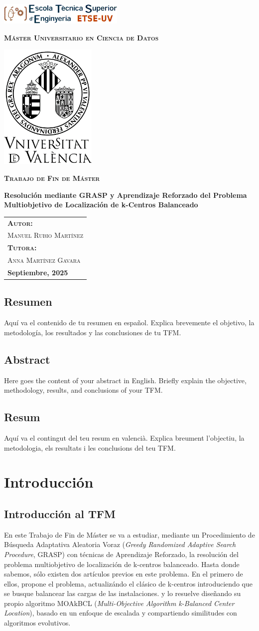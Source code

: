 \documentclass[12pt,a4paper]{book}
\newcommand{\nuevaportada}[6]{
    \thispagestyle{empty}
    \begin{center}
        \vfill 
        
        \includegraphics[width=0.45\textwidth]{images/logo.png}
        
        \vspace{0.5cm} %
        {\large\bfseries\textsc{M\'aster Universitario en #1}\par} %
        
        \vspace{0.5cm}
        \includegraphics[width=0.35\textwidth]{images/uv.png} %
        
        \vspace{0.5cm}
        {\large\bfseries\textsc{Trabajo de Fin de M\'aster}\par} %
        
        \vfill 
        
        {\LARGE\bfseries #2\par} %
        
        \vfill %
        
        \begin{flushright}
            \begin{tabular}{l} 
                {\large\bfseries\textsc{Autor:}} \\
                {\large\textsc{#3}} \\ [0.2cm] %
                {\large\bfseries\textsc{Tutora:}} \\ 
                {\large\textsc{#4}} \\ [0.2cm] %
                {\large\bfseries #5} 
            \end{tabular}
        \end{flushright}
        
        \vfill %
    \end{center}
}
\begin{document}
\nuevaportada{Ciencia de Datos}{Resolución mediante GRASP y Aprendizaje Reforzado del Problema Multiobjetivo de Localización de k-Centros Balanceado }{Manuel Rubio Martínez}{Anna Martínez Gavara}{Septiembre, 2025}

\clearpage

\newpage
\tableofcontents

\newpage

\section*{Resumen}
Aquí va el contenido de tu resumen en español. Explica brevemente el objetivo, la metodología, los resultados y las conclusiones de tu TFM.

\newpage

\section*{Abstract}
Here goes the content of your abstract in English. Briefly explain the objective, methodology, results, and conclusions of your TFM.

\newpage

\section*{Resum}
Aquí va el contingut del teu resum en valencià. Explica breument l'objectiu, la metodologia, els resultats i les conclusions del teu TFM.

\newpage
 
\chapter{Introducción}

\section{Introducción al TFM}
En este Trabajo de Fin de Máster se va a estudiar, mediante un Procedimiento de Búsqueda Adaptativa Aleatoria Voraz (\textit{Greedy Randomized Adaptive Search Procedure}, GRASP) con técnicas de Aprendizaje Reforzado, la resolución del problema multiobjetivo de localización de k-centros balanceado.
Hasta donde sabemos, sólo existen dos artículos previos en este problema. En el primero de ellos, \citet{k-balanced_1} propone el problema, actualizándo el clásico de k-centros introduciendo que se busque balancear las cargas de las instalaciones.
y lo resuelve diseñando su propio algoritmo MOAkBCL (\textit{Multi-Objective Algorithm k-Balanced Center Location}), basado en un enfoque de escalada y compartiendo similitudes con algoritmos evolutivos.
\end{document}
